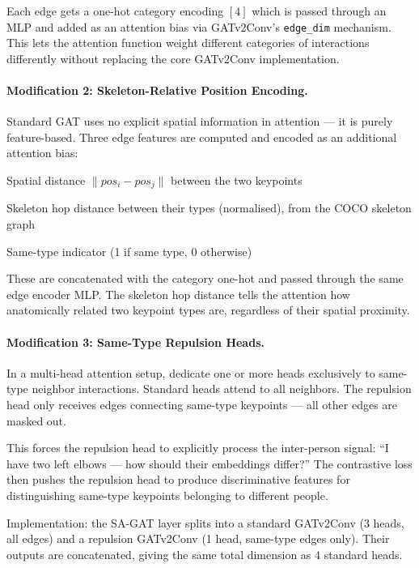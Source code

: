 Each edge gets a one-hot category encoding $[4]$ which is passed through an MLP and added as an attention bias via GATv2Conv's \texttt{edge\_dim} mechanism. This lets the attention function weight different categories of interactions differently without replacing the core GATv2Conv implementation.

\paragraph{Modification 2: Skeleton-Relative Position Encoding.}

Standard GAT uses no explicit spatial information in attention --- it is purely feature-based. Three edge features are computed and encoded as an additional attention bias:

\begin{compactitem}
  \item Spatial distance $\|pos_i - pos_j\|$ between the two keypoints
  \item Skeleton hop distance between their types (normalised), from the COCO skeleton graph
  \item Same-type indicator (1 if same type, 0 otherwise)
\end{compactitem}

These are concatenated with the category one-hot and passed through the same edge encoder MLP. The skeleton hop distance tells the attention how anatomically related two keypoint types are, regardless of their spatial proximity.

\paragraph{Modification 3: Same-Type Repulsion Heads.}

In a multi-head attention setup, dedicate one or more heads exclusively to same-type neighbor interactions. Standard heads attend to all neighbors. The repulsion head only receives edges connecting same-type keypoints --- all other edges are masked out.

This forces the repulsion head to explicitly process the inter-person signal: ``I have two left elbows --- how should their embeddings differ?'' The contrastive loss then pushes the repulsion head to produce discriminative features for distinguishing same-type keypoints belonging to different people.

Implementation: the SA-GAT layer splits into a standard GATv2Conv (3 heads, all edges) and a repulsion GATv2Conv (1 head, same-type edges only). Their outputs are concatenated, giving the same total dimension as 4 standard heads.


